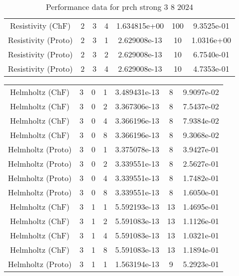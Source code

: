 \documentclass{article}
\begin{document}
\begin{small}
\begin{table}
\begin{center}
\begin{tabular}{|c|c|c|c|c|c||c|}
        Resistivity      (ChF) & 2 & 3 & 4& 1.634815e+00 & 100 & 9.3525e-01\\
        Resistivity    (Proto) & 2 & 3 & 1& 2.629008e-13 & 10 & 1.0316e+00\\
        Resistivity    (Proto) & 2 & 3 & 2& 2.629008e-13 & 10 & 6.7540e-01\\
        Resistivity    (Proto) & 2 & 3 & 4& 2.629008e-13 & 10 & 4.7353e-01\\
        \hline 
      \end{tabular} 
    \end{center}   
    \caption{Performance data for  prch strong 3 8 2024} 
  \end{table} 
\end{small}

\begin{small} 
  \begin{table} 
    \begin{center}
      \begin{tabular}{|c|c|c|c|c|c||c|} \hline 
        \hline 
        Helmholtz       (ChF) & 3 & 0 & 1& 3.489431e-13 & 8 & 9.9097e-02\\
        Helmholtz       (ChF) & 3 & 0 & 2& 3.367306e-13 & 8 & 7.5437e-02\\
        Helmholtz       (ChF) & 3 & 0 & 4& 3.366196e-13 & 8 & 7.9384e-02\\
        Helmholtz       (ChF) & 3 & 0 & 8& 3.366196e-13 & 8 & 9.3068e-02\\
        Helmholtz     (Proto) & 3 & 0 & 1& 3.375078e-13 & 8 & 3.9427e-01\\
        Helmholtz     (Proto) & 3 & 0 & 2& 3.339551e-13 & 8 & 2.5627e-01\\
        Helmholtz     (Proto) & 3 & 0 & 4& 3.339551e-13 & 8 & 1.7482e-01\\
        Helmholtz     (Proto) & 3 & 0 & 8& 3.339551e-13 & 8 & 1.6050e-01\\
        \hline 
        Helmholtz       (ChF) & 3 & 1 & 1& 5.592193e-13 & 13 & 1.4695e-01\\
        Helmholtz       (ChF) & 3 & 1 & 2& 5.591083e-13 & 13 & 1.1126e-01\\
        Helmholtz       (ChF) & 3 & 1 & 4& 5.591083e-13 & 13 & 1.0321e-01\\
        Helmholtz       (ChF) & 3 & 1 & 8& 5.591083e-13 & 13 & 1.1894e-01\\
        Helmholtz     (Proto) & 3 & 1 & 1& 1.563194e-13 & 9 & 5.2923e-01\\

\end{tabular}
\end{center}
\end{table}
\end{small}
\end{document}
